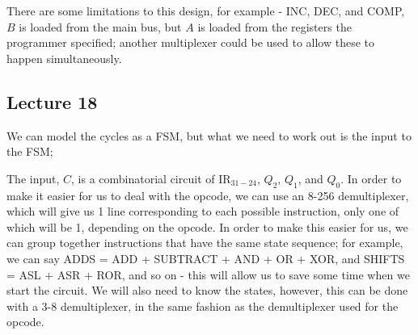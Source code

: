 \documentclass[a4paper, 12pt]{article}
\begin{document}
            There are some limitations to this design, for example - INC, DEC, and COMP, $B$ is loaded from the main bus, but $A$ is loaded from the registers the programmer specified; another multiplexer could be used to allow these to happen simultaneously.
        \subsection*{Lecture 18}
            We can model the cycles as a FSM, but what we need to work out is the input to the FSM;
            \begin{center}
            \end{center}
            The input, $C$, is a combinatorial circuit of $\text{IR}_{31-24}$, $Q_2$, $Q_1$, and $Q_0$. In order to make it easier for us to deal with the opcode, we can use an 8-256 demultiplexer, which will give us 1 line corresponding to each possible instruction, only one of which will be 1, depending on the opcode. In order to make this easier for us, we can group together instructions that have the same state sequence; for example, we can say ADDS = ADD + SUBTRACT + AND + OR + XOR, and SHIFTS = ASL + ASR + ROR, and so on - this will allow us to save some time when we start the circuit. We will also need to know the states, however, this can be done with a 3-8 demultiplexer, in the same fashion as the demultiplexer used for the opcode.
            \medskip
\end{document}

